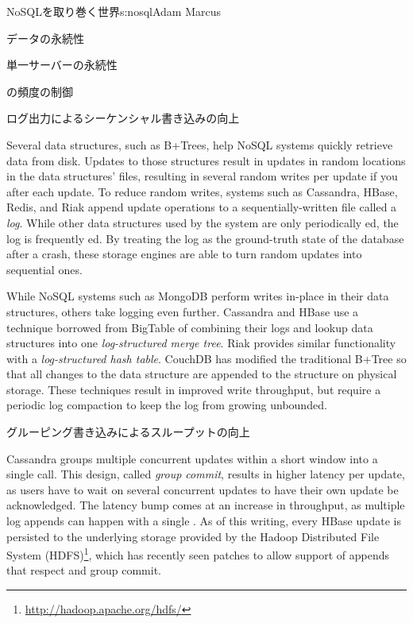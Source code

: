 \begin{aosachapter}{NoSQLを取り巻く世界}{s:nosql}{Adam Marcus}
\begin{aosasect1}{データの永続性}
\begin{aosasect2}{単一サーバーの永続性}
\begin{aosasect3}{の頻度の制御}
\end{aosasect3}

\begin{aosasect3}{ログ出力によるシーケンシャル書き込みの向上}

Several data structures, such as B+Trees, help NoSQL systems quickly
retrieve data from disk.  Updates to those structures result in
updates in random locations in the data structures' files, resulting
in several random writes per update if you  after each
update.  To reduce random writes, systems such as Cassandra, HBase,
Redis, and Riak append update operations to a sequentially-written
file called a \emph{log}.  While other data structures used by the
system are only periodically ed, the log is frequently
ed.  By treating the log as the ground-truth state of the
database after a crash, these storage engines are able to turn random
updates into sequential ones.

While NoSQL systems such as MongoDB perform writes in-place in their
data structures, others take logging even further.  Cassandra and
HBase use a technique borrowed from BigTable of combining their logs
and lookup data structures into one \emph{log-structured merge tree}.
Riak provides similar functionality with a \emph{log-structured hash
table}.  CouchDB has modified the traditional B+Tree so that all
changes to the data structure are appended to the structure on
physical storage.  These techniques result in improved write
throughput, but require a periodic log compaction to keep the log from
growing unbounded.

\end{aosasect3}

\begin{aosasect3}{グルーピング書き込みによるスループットの向上}

Cassandra groups multiple concurrent updates within a short window
into a single  call.  This design, called \emph{group
commit}, results in higher latency per update, as users have to wait
on several concurrent updates to have their own update be
acknowledged.  The latency bump comes at an increase in throughput, as
multiple log appends can happen with a single .  As of
this writing, every HBase update is persisted to the underlying
storage provided by the Hadoop Distributed File System
(HDFS)\footnote{\url{http://hadoop.apache.org/hdfs/}}, which has
recently seen patches to allow support of appends that respect
 and group commit.


\end{aosasect3}
\end{aosasect2}
\end{aosasect1}
\end{aosachapter}
